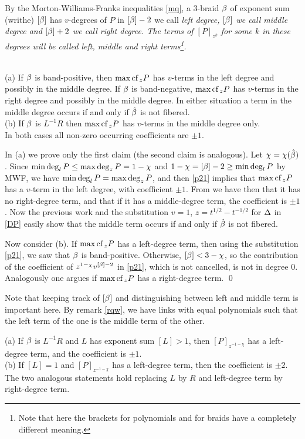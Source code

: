 By the Morton-Williams-Franks inequalities \eqref{mq},
a 3-braid $\beta$ of exponent sum (writhe) $[\beta]$ has $v$-degrees of
$P$ in $[\beta]-2$ we call \em{left degree}, $[\beta]$ we call \em{middle
degree} and $[\beta]+2$ we call \em{right degree}. The terms of
$[P]_{z^k}$ for some $k$ in these degrees will be called left,
middle and right terms\footnote{Note that here the brackets for
polynomials and for braids have a completely different meaning.}. 

\begin{lemma}\label{lemg}\mbox{}\\
(a) If $\beta$ is band-positive, then $\max\text{\rm cf}\,_zP$ has $v$-terms in the left
degree and possibly in the middle degree. If $\beta$ is band-negative,
$\max\text{\rm cf}\,_zP$ has $v$-terms in the right degree and possibly in the
middle degree. In either situation a term in the middle degree occurs
if and only if $\hat{\beta}$ is not fibered.\\
(b) If $\beta$ is $L^{-1}R$
then $\max\text{\rm cf}\,_zP$ has $v$-terms in the middle degree only.\\
In both cases all non-zero occurring coefficients are $\pm 1$.
\end{lemma}

\proof In (a) we prove only the first claim (the second
claim is analogous). Let $\chi=\chi(\hat{\beta})$. Since
$\min\deg_lP\le \max\deg_zP=1-\chi$ and $1-\chi=[\beta]-2\ge 
\min\deg_lP$ by MWF, we have $\min\deg_lP=\max\deg_zP$, and then \eqref{p21}
implies that $\max\text{\rm cf}\,_zP$ has a $v$-term in the left
degree, with coefficient $\pm 1$. From \cite[Theorem 3]{3br} we
have then that it has no right-degree term, and that if it has
a middle-degree term, the coefficient is $\pm 1$. Now the
previous work and the substitution $v=1$, $z=t^{1/2}-t^{-1/2}$
for $\Delta$ in \eqref{DP} easily show that the middle term
occurs if and only if $\hat{\beta}$ is not fibered.

Now consider (b). If $\max\text{\rm cf}\,_zP$ has a left-degree term, then using
the substitution \eqref{p21}, we saw that $\beta$ is band-positive.
Otherwise, $[\beta]<3-\chi$, so the contribution of the coefficient
of $z^{1-\chi}v^{[\beta]-2}$ in \eqref{p21}, which is not cancelled,
is not in degree $0$. Analogously one argues if $\max\text{\rm cf}\,_zP$ has a
right-degree term. \qed

Note that keeping track of $[\beta]$ and distinguishing between
left and middle term is important here. By remark \ref{rqw},
we have links with equal polynomials such that the left
term of the one is the middle term of the other.

\begin{lemma}\label{lemldg}
(a) If $\beta$ is $L^{-1}R$ and $L$ has exponent sum $[L]>1$, then
$[P]_{z^{-1-\chi}}$ has a left-degree term, and the coefficient
is $\pm 1$. \\
(b) If $[L]=1$ and
$[P]_{z^{-1-\chi}}$ has a left-degree term, then the coefficient
is $\pm 2$. \\
The two analogous statements hold replacing $L$ by $R$
and left-degree term by right-degree term.
\end{lemma}


